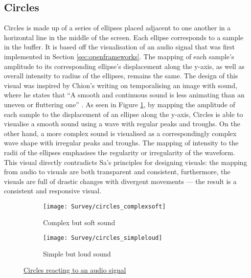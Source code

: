 \documentclass[../initial_thesis.tex]{subfiles}
\begin{document}
\subsection{Circles}
Circles is made up of a series of ellipses placed adjacent to one another in a horizontal line in the middle of the screen. Each ellipse corresponds to a sample in the buffer. It is based off the visualisation of an audio signal that was first implemented in Section \ref{sec:openframeworks}. The mapping of each sample's amplitude to its corresponding ellipse's displacement along the y-axis, as well as overall intensity to radius of the ellipses, remains the same. The design of this visual was inspired by Chion's writing on temporalising an image with sound, where he states that ``A smooth and continuous sound is less animating than an uneven or fluttering one'' \cite{Chion1994}. As seen in Figure \ref{fig:circles1}, by mapping the amplitude of each sample to the displacement of an ellipse along the y-axis, Circles is able to visualise a smooth sound using a wave with regular peaks and troughs. On the other hand, a more complex sound is visualised as a correspondingly complex wave shape with irregular peaks and troughs. The mapping of intensity to the radii of the ellipses emphasises the regularity or irregularity of the waveform. This visual directly contradicts Sa's principles for designing visuals: the mapping from audio to visuals are both transparent and consistent, furthermore, the visuals are full of drastic changes with divergent movements --- the result is a consistent and responsive visual.

\begin{figure}
  \begin{subfigure}{0.5\textwidth}
    \texttt{[image: Survey/circles\_complexsoft]}
    \caption{Complex but soft sound}
  \end{subfigure} 
  \begin{subfigure}{0.5\textwidth}
    \texttt{[image: Survey/circles\_simpleloud]}
    \caption{Simple but loud sound}
  \end{subfigure}
  \caption{\href{https://vimeo.com/326765323}{Circles reacting to an audio signal}}
  \label{fig:circles1}
\end{figure}
\end{document}
